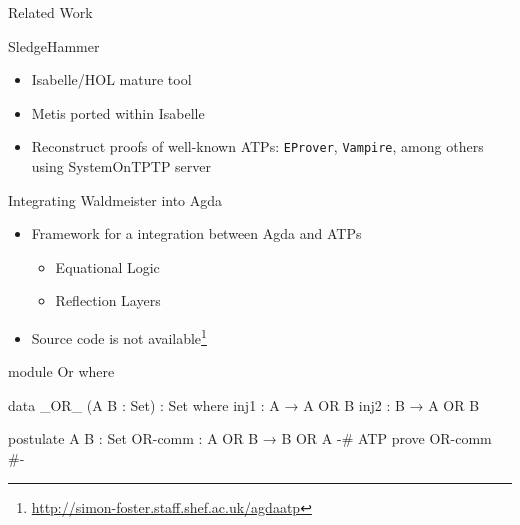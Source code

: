 \documentclass[xetex, hyperref={pdfpagelabels=false}]{beamer}
\begin{document}
\begin{frame}[fragile, label=hammer]{Related Work}
\begin{block}{SledgeHammer} \citep{Paulson2007}
\begin{itemize}
\item Isabelle/HOL mature tool
\item Metis ported within Isabelle
\item Reconstruct proofs of well-known ATPs: \texttt{EProver}, \texttt{Vampire},
among others using SystemOnTPTP server
\end{itemize}
\end{block}

\begin{block}{Integrating Waldmeister into Agda} \citep{Foster2011}
\begin{itemize}
  \item Framework for a integration between Agda and ATPs
  \begin{itemize}
    \item Equational Logic
    \item Reflection Layers
  \end{itemize}
  \item Source code is not available\footnote{\url{http://simon-foster.staff.shef.ac.uk/agdaatp}}
  \end{itemize}
\end{block}
\end{frame}


\begin{lrbox}{\agdapragma}
\begin{agda}
module Or where

data _OR_ (A B : Set) : Set where
  inj1 : A → A OR B
  inj2 : B → A OR B

postulate
  A B    : Set
  OR-comm : A OR B → B OR A
{-# ATP prove OR-comm #-}
\end{agda}
\end{lrbox}
\end{document}
